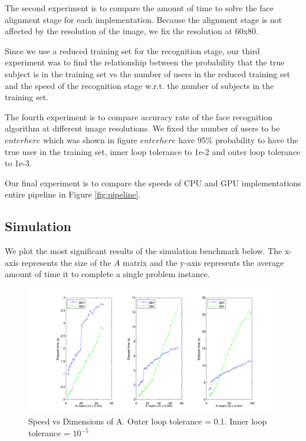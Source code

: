 \documentclass[10pt,twocolumn,letterpaper]{article}
\begin{document}

The second experiment is to compare the amount of time to solve the face alignment
stage for each implementation.  Because the alignment stage is not affected by the resolution of the image,
we fix the resolution at 60x80.

Since we use a reduced training set for the recognition stage, our third experiment was to 
find the relationship between the probability that the true subject is in the training set vs the
 number of users in the reduced training set and the speed of the recognition stage w.r.t.
 the number of subjects in the training set.  

The fourth experiment is to compare accuracy rate of the face recognition algorithm at different
image resolutions.  We fixed the number of users to be $enter here$ which was shown in figure  $enter here$  have 95\% probability
to have the true user in the training set, inner loop tolerance to 1e-2 and outer loop tolerance to 1e-3.  

Our final experiment is to compare the speeds of CPU and GPU implementations entire pipeline in Figure \ref{fig:pipeline}.

\subsection{Simulation}
\label{sec:simulation}

We plot the most significant results of the simulation benchmark below.  The x-axis represents the size of the 
$A$ matrix and the y-axis represents the average amount of time it to complete a single problem instance.

\begin{figure}[sim_plot]
\begin{center}
      \includegraphics{../results/random_data/time_vs_matrix_size_constant_tol.svg}
\end{center}
\caption{Speed vs Dimensions of A.  Outer loop tolerance = 0.1.  Inner loop tolerance = $10^{-5}$}
\end{figure}
\end{document}
